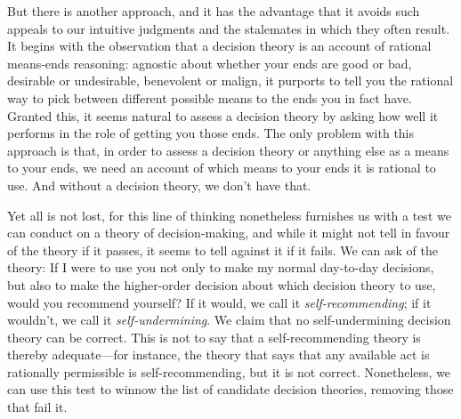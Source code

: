 \documentclass[a4paper]{article}
\newcommand\A{\mathcal{A}}
\newcommand\s{\mathsf{s}}
\newcommand\Exp{\mathsf{Exp}}
\newcommand\EU{\mathrm{EU}}
\newcommand\ut{u}
\newcommand\SetDelimiter[1][]{
	\nonscript\,#1\vert \allowbreak \nonscript\,\mathopen{}}
\providecommand\given{\SetDelimiter}
\renewcommand{\leq}{\leqslant}
\newenvironment{CCM rewritten}
{\begingroup\color{blue}} %
{\endgroup}              %
\begin{document}
But there is another approach, and it has the advantage that it avoids such appeals to our intuitive judgments and the stalemates in which they often result. It begins with the observation that a decision theory is an account of rational means-ends reasoning: agnostic about whether your ends are good or bad, desirable or undesirable, benevolent or malign, it purports to tell you the rational way to pick between different possible means to the ends you in fact have. Granted this, it seems natural to assess a decision theory by asking how well it performs in the role of getting you those ends. The only problem with this approach is that, in order to assess a decision theory or anything else as a means to your ends, we need an account of which means to your ends it is rational to use. And without a decision theory, we don't have that. 
	
Yet all is not lost, for this line of thinking nonetheless furnishes us with a test we can conduct on a theory of decision-making, and while it might not tell in favour of the theory if it passes, it seems to tell against it if it fails. We can ask of the theory: If I were to use you not only to make my normal day-to-day decisions, but also to make the higher-order decision about which decision theory to use, would you recommend yourself? If it would, we call it \textit{self-recommending}; if it wouldn't, we call it \textit{self-undermining}. We claim that no self-undermining decision theory can be correct. This is not to say that a self-recommending theory is thereby adequate---for instance, the theory that says that any available act is rationally permissible is self-recommending, but it is not correct. Nonetheless, we can use this test to winnow the list of candidate decision theories, removing those that fail it.


\end{document}
